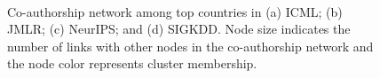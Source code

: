 \begin{figure}[!htbp]
	\centering
	\\
	\caption{Co-authorship network among top countries in (a) ICML; (b) JMLR; (c) NeurIPS; and (d) SIGKDD. Node size indicates the number of links with other nodes in the co-authorship network and the node color represents cluster membership.}
	\label{fig:country_top_gephi}
\end{figure}



